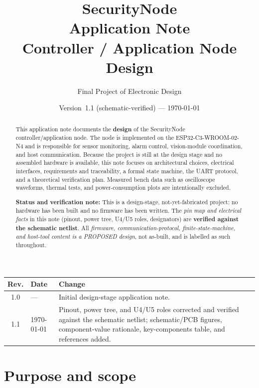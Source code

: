 \documentclass[11pt,a4paper]{article}
\title{
    \textbf{SecurityNode}\\[0.4em]
    \Large Application Note\\
    Controller / Application Node Design
}
\author{Final Project of Electronic Design}
\date{Version~1.1 (schematic-verified) --- \today}
\begin{document}
\maketitle

\begin{abstract}
This application note documents the \textbf{design} of the SecurityNode
controller/application node.  The node is implemented on the
ESP32-C3-WROOM-02-N4 and is responsible for sensor monitoring, alarm control,
vision-module coordination, and host communication.  Because the project is
still at the design stage and no assembled hardware is available, this note
focuses on architectural choices, electrical interfaces, requirements and
traceability, a formal state machine, the UART protocol, and a theoretical
verification plan.  Measured bench data such as oscilloscope waveforms, thermal
tests, and power-consumption plots are intentionally excluded.

\medskip
\noindent\textbf{Status and verification note:} This is a design-stage,
not-yet-fabricated project: no hardware has been built and no firmware has been
written.  The \emph{pin map and electrical facts} in this note (pinout, power
tree, U4/U5 roles, designators) are \textbf{verified against the schematic
netlist}.  All \emph{firmware, communication-protocol, finite-state-machine,
and host-tool content is a PROPOSED design}, not as-built, and is labelled as
such throughout.
\end{abstract}

\begin{center}\small
\begin{tabular}{@{}clp{8.4cm}@{}}
\toprule
\textbf{Rev.} & \textbf{Date} & \textbf{Change} \\
\midrule
1.0 & --- & Initial design-stage application note. \\
1.1 & \today & Pinout, power tree, and U4/U5 roles corrected and verified against the schematic netlist; schematic/PCB figures, component-value rationale, key-components table, and references added. \\
\bottomrule
\end{tabular}
\end{center}

\tableofcontents
\newpage

\section{Purpose and scope}
\end{document}
